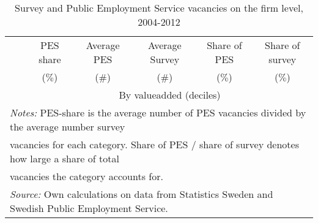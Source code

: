 \begin{table}[htbp]\centering
\caption{\label{tab:PES_survey} Survey and Public Employment Service vacancies on the firm level, 2004-2012}
\begin{tabularx} {\textwidth} { l X c  c  c c c} \\ \hline %
\textbf{ } & &\scriptsize{PES share}  & \scriptsize{Average PES}  &  \scriptsize{Average Survey} &  \scriptsize{Share of PES} &  \scriptsize{Share of survey }  \\
\textbf{ } && \scriptsize{($\%$)}  & \scriptsize{($\#$)}  &  \scriptsize{($\#$)} &  \scriptsize{($\%$)} &  \scriptsize{($\%$)}  \\
\midrule
           && \multicolumn{5}{c}{By valueadded (deciles)} \\
\midrule

\midrule
\hline
\multicolumn{7}{l}{\footnotesize{\emph{Notes:} PES-share is the average number of PES vacancies divided by the average number survey   }} \\
 \multicolumn{7}{l}{\footnotesize{vacancies for each category. Share of PES / share of survey denotes how large a share of total  }} \\
 \multicolumn{7}{l}{\footnotesize{vacancies the category accounts for.}} \\
\multicolumn{7}{l}{\footnotesize{\emph{Source:} Own calculations on data from Statistics Sweden and Swedish Public Employment Service.}} 
\end{tabularx}
\end{table}
			
			
